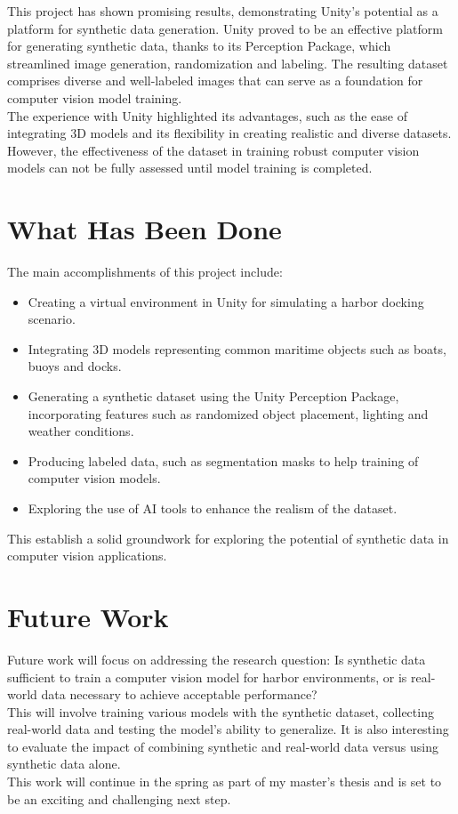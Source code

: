 
This project has shown promising results, demonstrating Unity's potential as a platform for synthetic data generation. Unity proved to be an effective platform for generating synthetic data, thanks to its Perception Package, which streamlined image generation, randomization and labeling. The resulting dataset comprises diverse and well-labeled images that can serve as a foundation for computer vision model training.\\

\noindent The experience with Unity highlighted its advantages, such as the ease of integrating 3D models and its flexibility in creating realistic and diverse datasets. However, the effectiveness of the dataset in training robust computer vision models can not be fully assessed until model training is completed.


\section{What Has Been Done}
The main accomplishments of this project include: 
\begin{itemize} 
\item Creating a virtual environment in Unity for simulating a harbor docking scenario. 
\item Integrating 3D models representing common maritime objects such as boats, buoys and docks. 
\item Generating a synthetic dataset using the Unity Perception Package, incorporating features such as randomized object placement, lighting and weather conditions. 
\item Producing labeled data, such as segmentation masks to help training of computer vision models. 
\item Exploring the use of AI tools to enhance the realism of the dataset. 
\end{itemize}
  
\noindent This establish a solid groundwork for exploring the potential of synthetic data in computer vision applications.

\section{Future Work}
Future work will focus on addressing the research question: Is synthetic data sufficient to train a computer vision model for harbor environments, or is real-world data necessary to achieve acceptable performance?\\

\noindent This will involve training various models with the synthetic dataset, collecting real-world data and testing the model's ability to generalize. It is also interesting to evaluate the impact of combining synthetic and real-world data versus using synthetic data alone.\\

\noindent This work will continue in the spring as part of my master's thesis and is set to be an exciting and challenging next step.
